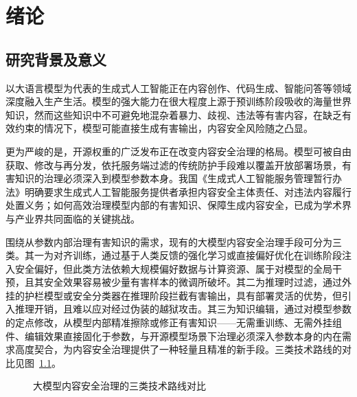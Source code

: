 \chapter{绪论}\label{chap:intro}

\section{研究背景及意义}

以大语言模型为代表的生成式人工智能正在内容创作、代码生成、智能问答等领域深度融入生产生活。模型的强大能力在很大程度上源于预训练阶段吸收的海量世界知识，然而这些知识中不可避免地混杂着暴力、歧视、违法等有害内容，在缺乏有效约束的情况下，模型可能直接生成有害输出，内容安全风险随之凸显。

更为严峻的是，开源权重的广泛发布正在改变内容安全治理的格局。模型可被自由获取、修改与再分发，依托服务端过滤的传统防护手段难以覆盖开放部署场景，有害知识的治理必须深入到模型参数本身。我国《生成式人工智能服务管理暂行办法》明确要求生成式人工智能服务提供者承担内容安全主体责任、对违法内容履行处置义务；如何高效治理模型内部的有害知识、保障生成内容安全，已成为学术界与产业界共同面临的关键挑战。

围绕从参数内部治理有害知识的需求，现有的大模型内容安全治理手段可分为三类。其一为对齐训练，通过基于人类反馈的强化学习\cite{ouyang2022instruct}或直接偏好优化\cite{rafailov2023dpo}在训练阶段注入安全偏好，但此类方法依赖大规模偏好数据与计算资源、属于对模型的全局干预，且其安全效果容易被少量有害样本的微调所破坏\cite{qi2023finetuning}。其二为推理时过滤，通过外挂的护栏模型或安全分类器在推理阶段拦截有害输出，具有部署灵活的优势，但引入推理开销，且难以应对经过伪装的越狱攻击。其三为知识编辑，通过对模型参数的定点修改，从模型内部精准擦除或修正有害知识\cite{zhang2024comprehensive}——无需重训练、无需外挂组件、编辑效果直接固化于参数，与开源模型场景下治理必须深入参数本身的内在需求高度契合，为内容安全治理提供了一种轻量且精准的新手段。三类技术路线的对比见图~\ref{fig:chap1-route}。

\begin{figure}[htbp]
  \centering
  \caption{大模型内容安全治理的三类技术路线对比}
  \label{fig:chap1-route}
\end{figure}

